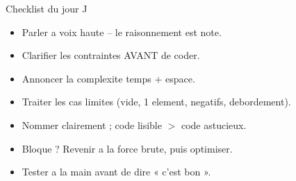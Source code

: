\documentclass[11pt,a4paper]{article}
\begin{document}
\vspace{0.6cm}
\begin{infobox}{Checklist du jour J}
\begin{itemize}[leftmargin=*,itemsep=2pt,topsep=2pt]
  \item Parler a voix haute -- le raisonnement est note.
  \item Clarifier les contraintes AVANT de coder.
  \item Annoncer la complexite temps + espace.
  \item Traiter les cas limites (vide, 1 element, negatifs, debordement).
  \item Nommer clairement ; code lisible $>$ code astucieux.
  \item Bloque ? Revenir a la force brute, puis optimiser.
  \item Tester a la main avant de dire « c'est bon ».
\end{itemize}
\end{infobox}
\end{document}
